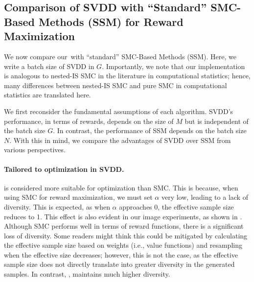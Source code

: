 { \subsection{Comparison of SVDD with ``Standard'' SMC-Based Methods (SSM) for Reward Maximization}
\label{sec:dif_smc_svdd}

We now compare our \alg\,with ``standard'' SMC-Based Methods (SSM). Here, we write a batch size of SVDD in $G$. Importantly, we note that our implementation is analogous to nested-IS SMC in the literature in computational statistics; hence, many differences between nested-IS SMC \citep{naesseth2019elements,naesseth2015nested} and pure SMC in computational statistics are translated here.    


We first reconsider the fundamental assumptions of each algorithm. SVDD's performance, in terms of rewards, depends on the size of $M$ but is independent of the batch size $G$. In contrast, the performance of SSM depends on the batch size $N$. With this in mind, we compare the advantages of SVDD over SSM from various perspectives.

\paragraph{Tailored to optimization in SVDD.} \alg is considered more suitable for optimization than SMC. This is because, when using SMC for reward maximization, we must set $\alpha$ very low, leading to a lack of diversity. This is expected, as when $\alpha$ approaches 0, the effective sample size reduces to 1. This effect is also evident in our image experiments, as shown in . Although SMC performs well in terms of reward functions, there is a significant loss of diversity. Some readers might think this could be mitigated by calculating the effective sample size based on weights (i.e., value functions) and resampling when the effective size decreases; however, this is not the case, as the effective sample size does not directly translate into greater diversity in the generated samples. In contrast, \alg, maintains much higher diversity.

}
